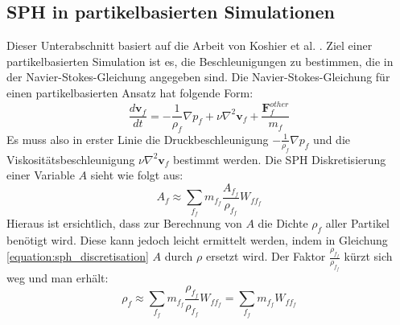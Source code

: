 \documentclass[11pt,
a4paper,
parskip=half, %
BCOR=10mm, %
english,
ngerman]{scrreprt}
\begin{document}
\subsection{SPH in partikelbasierten Simulationen}
Dieser Unterabschnitt basiert auf die Arbeit von Koshier et al. \cite{koschier_smoothed_2020}.
Ziel einer partikelbasierten Simulation ist es, die Beschleunigungen zu bestimmen, die in der Navier-Stokes-Gleichung angegeben sind.
Die Navier-Stokes-Gleichung für einen partikelbasierten Ansatz hat folgende Form:
\begin{equation}
    \frac{d\textbf{v}_f}{dt} = -\frac{1}{\rho_f} \nabla p_f + \nu \nabla^2 \textbf{v}_f + \frac{\textbf{F}_f^{other}}{m_f}
\end{equation}
Es muss also in erster Linie die Druckbeschleunigung $-\frac{1}{\rho_f} \nabla p_f$ und
die Viskositätsbeschleunigung $\nu \nabla^2 \textbf{v}_f$ bestimmt werden.
Die SPH Diskretisierung einer Variable $A$ sieht wie folgt aus:
\begin{equation}
    \label{equation:sph_discretisation}
    A_f \approx \sum_{f_f} m_{f_f} \frac{A_{f_f}}{\rho_{f_f}} W_{ff_f}
\end{equation}
Hieraus ist ersichtlich, dass zur Berechnung von $A$ die Dichte $\rho_f$ aller Partikel benötigt wird.
Diese kann jedoch leicht ermittelt werden, indem in Gleichung \ref{equation:sph_discretisation} $A$ durch $\rho$ ersetzt wird.
Der Faktor $\frac{\rho_{f_f}}{\rho_{f_f}}$ kürzt sich weg und man erhält:
\begin{equation}
    \rho_f \approx \sum_{f_f} m_{f_f} \frac{\rho_{f_f}}{\rho_{f_f}} W_{ff_f} = \sum_{f_f} m_{f_f} W_{ff_f}
\end{equation}
\end{document}
